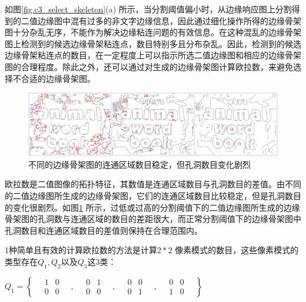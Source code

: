         如图\ref{fig.c3_select_skeleton}(a) 所示，当分割阈值偏小时，从边缘响应图上分割得到的二值边缘图中混有过多的非文字边缘信息，因此通过细化操作所得的边缘骨架图十分杂乱无序，不能作为解决边缘粘连问题的有效信息。在这种混乱的边缘骨架图上检测到的候选边缘骨架粘连点，数目特别多且分布杂乱。因此，检测到的候选边缘骨架粘连点的数目，在一定程度上可以指示所选二值边缘图和相应的边缘骨架图的合理程度。除此之外，还可以通过对生成的边缘骨架图计算欧拉数，来避免选择不合适的边缘骨架图。

        \begin{figure}[!h]
        \centering
        \includegraphics[width=\textwidth]{./figures/c3_compare_skeleton.jpg}
        \caption{不同的边缘骨架图的连通区域数目稳定，但孔洞数目变化剧烈}
        \label{fig.c3_compare_skeleton}
        \end{figure}

        欧拉数是二值图像的拓扑特征，其数值是连通区域数目与孔洞数目的差值。由不同的二值边缘图所生成的边缘骨架图，它们的连通区域数目比较稳定，但是孔洞数目的变化很剧烈。如图\ref{fig.c3_compare_skeleton} 所示，过低或过高的分割阈值下的二值边缘图所生成的边缘骨架图的孔洞数与连通区域的数目的差距很大，而正常分割阈值下的边缘骨架图中孔洞数目和连通区域数目的差值则保持在合理范围内。

        1种简单且有效的计算欧拉数的方法是计算$2*2$ 像素模式的数目，这些像素模式的类型存在$Q_1,Q_2$以及$Q_3$这3类：


        $Q_1 = \left\{
        \quad
        \begin{matrix} 1 & 0 \\ 0 & 0 \end{matrix}\quad,\quad
        \begin{matrix} 0 & 1 \\ 0 & 0 \end{matrix}\quad,\quad
        \begin{matrix} 0 & 0 \\ 0 & 1 \end{matrix}\quad,\quad
        \begin{matrix} 0 & 0 \\ 1 & 0 \end{matrix}
        \quad
        \right\}$

